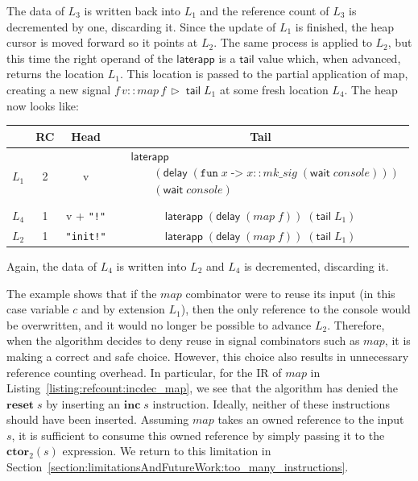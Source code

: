 The data of $L_3$ is written back into $L_1$ and the reference count of $L_3$ is decremented by one, discarding it. 
Since the update of $L_1$ is finished, the heap cursor is moved forward so it points at $L_2$.
The same process is applied to $L_2$, but this time the right operand of the $\mathsf{laterapp}$ is a $\mathsf{tail}$ value which, when advanced, returns the location $L_1$. This location is passed to the partial application of map, creating a new signal $f \, v :: map \, f \, \triangleright \; \mathsf{tail} \; L_1$ at some fresh location $L_4$. 
The heap now looks like:
\begin{center}
\begin{tabular}{ |c|c|c|c| } 
 \hline
  & RC & Head & Tail \\ 
  \hline
    $L_1$ & 2 & v &
    $
    \begin{aligned}
        &\mathsf{laterapp} \\
        &\qquad (\mathsf{delay} \; (\texttt{fun} \; x \; \texttt{->} \; x :: mk\_sig \; (\mathsf{wait} \; console))) \\
        &\qquad (\mathsf{wait} \; console) \\
    \end{aligned}
    $ \\
  \hline
    $L_4$ & 1 & v + \texttt{"!"} &
    $\mathsf{laterapp}
      \; (\mathsf{delay} \; (map \; f))
      \; (\mathsf{tail} \; L_1)
    $ \\
  \hline
    $L_2$ & 1 & \texttt{"init!"} &
    $\mathsf{laterapp}
      \; (\mathsf{delay} \; (map \; f))
      \; (\mathsf{tail} \; L_1)
    $ \\
 \hline
\end{tabular}
\end{center}

Again, the data of $L_4$ is written into $L_2$ and $L_4$ is decremented, discarding it.

The example shows that if the $map$ combinator were to reuse its input (in this case variable $c$ and by extension $L_1$), then the only reference to the console would be overwritten, and it would no longer be possible to advance $L_2$.
Therefore, when the algorithm decides to deny reuse in signal combinators such as $map$, it is making a correct and safe choice.
However, this choice also results in unnecessary reference counting overhead. In particular, for the IR of $map$ in Listing~\ref{listing:refcount:incdec_map}, we see that the algorithm has denied the $\mathbf{reset} \; s$ by inserting an $\mathbf{inc} \; s$ instruction. Ideally, neither of these instructions should have been inserted. Assuming $map$ takes an owned reference to the input $s$, it is sufficient to consume this owned reference by simply passing it to the $\mathbf{ctor}_2(s)$ expression. 
We return to this limitation in Section~\ref{section:limitationsAndFutureWork:too_many_instructions}. 
